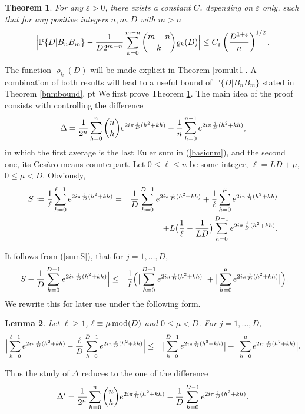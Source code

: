 \documentclass[11pt,draft,reqno]{amsart}
\newtheorem{theorem}{Theorem}[section]
\newtheorem{lemma}[theorem]{Lemma}
\theoremstyle{definition}
\theoremstyle{remarks}
\numberwithin{equation}{section}
\def \D{{\Delta}}
\def \e{{\varepsilon}}
\def \m{{\mu}}
\def\P{{\mathcal P}}
\def\P{{\mathbb P}}
\begin{document}
 \begin{theorem}\label{p4.5} For any $\e>0$, there exists a constant $C_\e$ depending on $\e$ only, such that  for any
 positive  integers
 $n,m, D$ with 
 $m>n$
\begin{equation}\label{4.11} \Big|\P \{ D|B_nB_m \}-  {1\over D  2^{ m-n}} \sum_{k=0}^{m-n} { {{m-n}\choose {k}}     } \varrho_k(D) 
\Big|
\le C_\e
\left({     D  ^{1 + \e}\over   n }\right)^{1/2 }. 
\end{equation} 
\end{theorem}
  The function    $\varrho_k(D)$ will be  made  explicit    in Theorem \ref{romult1}. A combination of   both results   will lead to  a useful bound of $\P \{ D|B_nB_m
\}$  stated in   Theorem \ref{bnmbound}. 
 pt
 We first prove Theorem \ref{p4.5}.  The main idea of the proof consists with   controlling the difference
$$\D=  {1\over
2^n }  \sum_{h=0}^n   {{n}\choose{h}} e^{2i\pi{j\over D}  (h^2+kh)}- {1\over n}\sum_{h=0}^{n-1}  e^{2i\pi{j\over D} 
(h^2+kh)},$$
 in which the first average   is the  last Euler sum   in (\ref{basicnm}), and  the second one,  its Ces\`aro means counterpart.  Let 
  $0\le
\ell
\le n$ be some integer,   
$\ell=LD+\m$,
$0\le \m< D$. Obviously,
\begin{eqnarray}\label{sumS} S  := {1\over \ell}\sum_{h=0}^{\ell-1}  e^{2i\pi{j\over D} 
(h^2+kh)}  & =& {1\over D}\sum_{h= 0}^{D-1}e^{2i\pi{j\over D} 
(h^2+kh)}  +   {1\over \ell}\sum_{h= 0}^{\m}e^{2i\pi{j\over D}  
(h^2+kh)} 
\cr & &  +L\big({1\over \ell}-{1\over LD}\big)\sum_{h= 0}^{D-1}e^{2i\pi{j\over D} 
(h^2+kh)}.
 \end{eqnarray}
 
 
It follows from (\ref{sumS}),    that 
  for   $j=1,\ldots, D$, 
\begin{eqnarray*} \Big|S-{1\over D}\sum_{h= 0}^{D-1}e^{2i\pi{j\over D} 
(h^2+kh)} \Big|  &\le  &  {1\over  \ell} \Big(\big|\sum_{h= 0}^{D-1}e^{2i\pi{j\over D} 
(h^2+kh)} \big|  +  \big|\sum_{h= 0}^{\m}e^{2i\pi{j\over D} 
(h^2+kh)}\big|\Big).
\end{eqnarray*} 
   We   rewrite this for   later use under the following form.
  \begin{lemma} \label{basicnm2}Let
$\ell\ge 1$, $\ell\equiv \m \, {\rm mod}(D)$ and
$0\le \m< D$.  For   $j=1,\ldots, D$, 
\begin{eqnarray*} \Big| \sum_{h=0}^{\ell-1}  e^{2i\pi{j\over D} 
(h^2+kh)}-{\ell\over D}\sum_{h= 0}^{D-1}e^{2i\pi{j\over D} 
(h^2+kh)} \Big|   
  & \le   &  \big|\sum_{h= 0}^{D-1}e^{2i\pi{j\over D} 
(h^2+kh)} \big|    +  \big|\sum_{h= 0}^{\m}e^{2i\pi{j\over D} 
(h^2+kh)}\big| .
\end{eqnarray*}  \end{lemma}
  Thus the study of $\D$ reduces to the one of the difference
$$ \D'= {1\over
2^n }  \sum_{h=0}^n   {{n}\choose{h}} e^{2i\pi{j\over D}  (h^2+kh)}- {1\over D}\sum_{h=0}^{D-1}e^{2i\pi{j\over D} 
(h^2+kh)} .
$$ 
\end{document}
